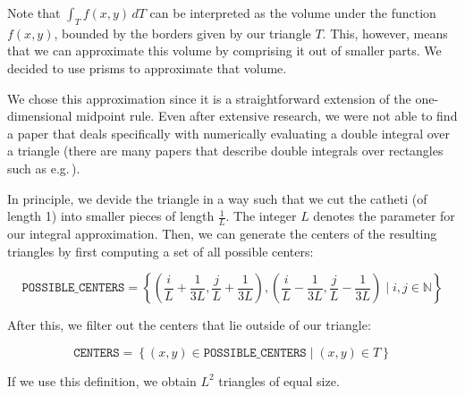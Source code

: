 \documentclass{article}
\begin{document}
Note that $\int_T f(x,y)\,dT$ can be interpreted as the volume under the function $f(x,y)$, bounded by the borders given by our triangle $T$. This, however, means that we can approximate this volume by comprising it out of smaller parts. We decided to use prisms to approximate that volume.

We chose this approximation since it is a straightforward extension of the one-dimensional midpoint rule. Even after extensive research, we were not able to find a paper that deals specifically with numerically evaluating a double integral over a triangle (there are many papers that describe double integrals over rectangles such as e.g.\,\cite{lang1987double}).

In principle, we devide the triangle in a way such that we cut the catheti (of length 1) into smaller pieces of length $\frac{1}{L}$. The integer $L$ denotes the parameter for our integral approximation. Then, we can generate the centers of the resulting triangles by first computing a set of all possible centers:

\begin{equation*}
  \mathtt{POSSIBLE\_CENTERS} = \left\{
    \left(\frac{i}{L} + \frac{1}{3L}, \frac{j}{L} + \frac{1}{3L}\right) ,
    \left(\frac{i}{L} - \frac{1}{3L}, \frac{j}{L} - \frac{1}{3L}\right)
    \mid
    i, j\in \mathbb{N}
  \right\}
\end{equation*}

After this, we filter out the centers that lie outside of our triangle:

\begin{equation*}
  \mathtt{CENTERS} = \left\{
    (x,y)\in \mathtt{POSSIBLE\_CENTERS}
    \mid
    (x,y) \in T
  \right\}
\end{equation*}

If we use this definition, we obtain $L^2$ triangles of equal size.
\end{document}
